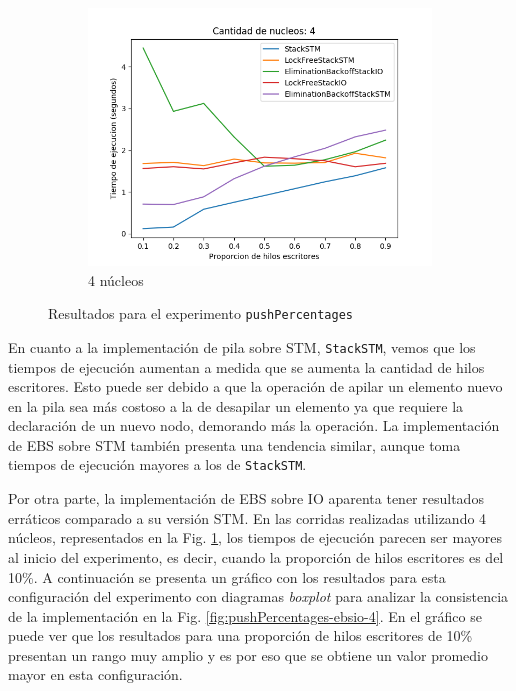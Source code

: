 \begin{figure}[H]
\begin{subfigure}[b]{0.5\textwidth}
        \includegraphics[width=\textwidth]{images/pushPercentages/plots/4.png}
        \caption{4 núcleos}
        \label{subfig:pushPercentages-4core}
    \end{subfigure}
    \caption{Resultados para el experimento \texttt{pushPercentages}}
    \label{fig:pushPercentages-all}
\end{figure}

En cuanto a la implementación de pila sobre STM, \texttt{StackSTM}, vemos que los tiempos de ejecución aumentan a medida que se aumenta la cantidad de hilos escritores.
Esto puede ser debido a que la operación de apilar un elemento nuevo en la pila sea más costoso a la de desapilar un elemento ya que requiere la declaración de un nuevo nodo, demorando más la operación.
La implementación de EBS sobre STM también presenta una tendencia similar, aunque toma tiempos de ejecución mayores a los de \texttt{StackSTM}.

Por otra parte, la implementación de EBS sobre IO aparenta tener resultados erráticos comparado a su versión STM.
En las corridas realizadas utilizando 4 núcleos, representados en la Fig. \ref{subfig:pushPercentages-4core}, los tiempos de ejecución parecen ser mayores al inicio del experimento, es decir, cuando la proporción de hilos escritores es del 10\%.
A continuación se presenta un gráfico con los resultados para esta configuración del experimento con diagramas \emph{boxplot} para analizar la consistencia de la implementación en la Fig. \ref{fig:pushPercentages-ebsio-4}.
En el gráfico se puede ver que los resultados para una proporción de hilos escritores de 10\% presentan un rango muy amplio y es por eso que se obtiene un valor promedio mayor en esta configuración.


